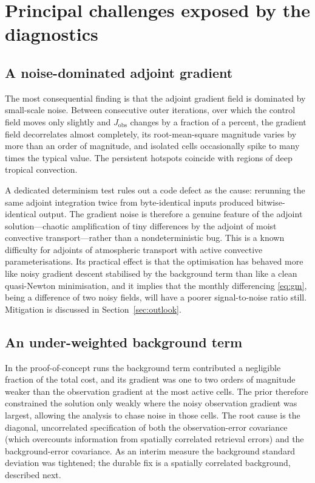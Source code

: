 \documentclass[12pt]{article}
\begin{document}
\section{Principal challenges exposed by the diagnostics}
\label{sec:challenges}

\subsection{A noise-dominated adjoint gradient}

The most consequential finding is that the adjoint gradient field is dominated by
small-scale noise. Between consecutive outer iterations, over which the control
field moves only slightly and $J_{\mathrm{obs}}$ changes by a fraction of a
percent, the gradient field decorrelates almost completely, its root-mean-square
magnitude varies by more than an order of magnitude, and isolated cells
occasionally spike to many times the typical value. The persistent hotspots
coincide with regions of deep tropical convection.

A dedicated determinism test rules out a code defect as the cause: rerunning the
same adjoint integration twice from byte-identical inputs produced
bitwise-identical output. The gradient noise is therefore a genuine feature of
the adjoint solution---chaotic amplification of tiny differences by the adjoint
of moist convective transport---rather than a nondeterministic bug. This is a
known difficulty for adjoints of atmospheric transport with active convective
parameterisations. Its practical effect is that the optimisation has behaved
more like noisy gradient descent stabilised by the background term than like a
clean quasi-Newton minimisation, and it implies that the monthly differencing
\eqref{eq:gm}, being a difference of two noisy fields, will have a poorer
signal-to-noise ratio still. Mitigation is discussed in
Section~\ref{sec:outlook}.

\subsection{An under-weighted background term}

In the proof-of-concept runs the background term contributed a negligible
fraction of the total cost, and its gradient was one to two orders of magnitude
weaker than the observation gradient at the most active cells. The prior
therefore constrained the solution only weakly where the noisy observation
gradient was largest, allowing the analysis to chase noise in those cells. The
root cause is the diagonal, uncorrelated specification of both the
observation-error covariance (which overcounts information from spatially
correlated retrieval errors) and the background-error covariance. As an interim
measure the background standard deviation was tightened; the durable fix is a
spatially correlated background, described next.
\end{document}
